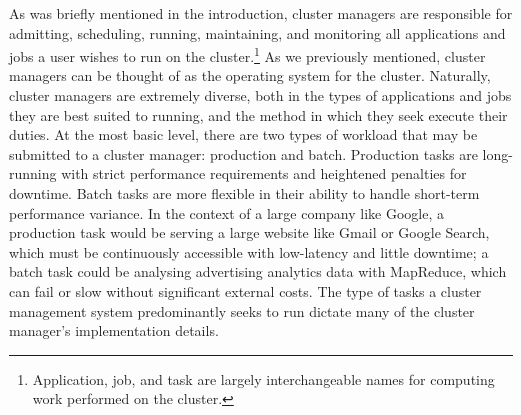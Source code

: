 As was briefly mentioned in the introduction, cluster managers are responsible
for admitting, scheduling, running, maintaining, and monitoring all applications
and jobs a user wishes to run on the cluster.\footnote{Application, job, and
task are largely interchangeable names for computing work performed on the
cluster.} As we previously mentioned, cluster managers can be thought of as the
operating system for the cluster. Naturally, cluster managers are
extremely diverse, both in the types of applications and jobs they are best
suited to running, and the method in which they seek execute their duties.
At the most basic level, there are two types of workload that may be submitted
to a cluster manager: production and batch. Production tasks are long-running
with strict performance requirements and heightened penalties for downtime. Batch tasks are
more flexible in their ability to handle short-term performance variance. In the
context of a large company like Google, a production task would be serving a
large website like Gmail or Google Search, which must be continuously
accessible with low-latency
and little downtime; a batch task could be analysing advertising analytics data
with MapReduce, which can fail or slow without significant external
costs.\cite[pg. 1]{borg} The type of tasks a cluster management system
predominantly seeks to run dictate many of the cluster manager's implementation details.

